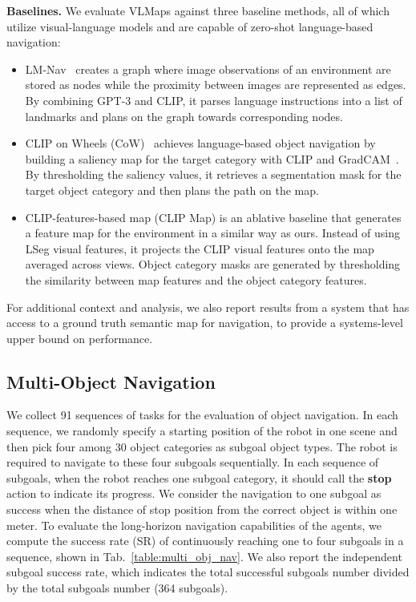 \documentclass[letterpaper, 10 pt, conference]{ieeeconf}  %
\begin{document}
\noindent\textbf{Baselines.} We evaluate VLMaps against three baseline methods, all of which utilize visual-language models and are capable of zero-shot language-based navigation:
\begin{itemize}[leftmargin=*]
  \item LM-Nav~\cite{shah2022lm} creates a graph where image observations of an environment are stored as nodes while the proximity between images are represented as edges. By combining GPT-3 and CLIP, it parses language instructions into a list of landmarks and plans on the graph towards corresponding nodes. 
  \item CLIP on Wheels (CoW)~\cite{gadre2022clip} achieves language-based object navigation by building a saliency map for the target category with CLIP and GradCAM~\cite{selvaraju2020grad}. By thresholding the saliency values, it retrieves a segmentation mask for the target object category and then plans the path on the map.
  \item CLIP-features-based map (CLIP Map) is an ablative baseline that generates a feature map for the environment in a similar way as ours. Instead of using LSeg visual features, it projects the CLIP visual features onto the map averaged across views. Object category masks are generated by thresholding the similarity between map features and the object category features.
\end{itemize}
For additional context and analysis, we also report results from a system that has access to a ground truth semantic map for navigation, to provide a systems-level upper bound on performance.

\subsection{Multi-Object Navigation}
\label{sec:exp_multi_object_navigation}
We collect 91 sequences of tasks for the evaluation of object navigation. In each sequence, we randomly specify a starting position of the robot in one scene and then pick four among 30 object categories as subgoal object types. The robot is required to navigate to these four subgoals sequentially. In each sequence of subgoals, when the robot reaches one subgoal category, it should call the \textbf{stop} action to indicate its progress. We consider the navigation to one subgoal as success when the distance of stop position from the correct object is within one meter. To evaluate the long-horizon navigation capabilities of the agents, we compute the success rate (SR) of continuously reaching one to four subgoals in a sequence, shown in Tab.~\ref{table:multi_obj_nav}. We also report the independent subgoal success rate, which indicates the total successful subgoals number divided by the total subgoals number (364 subgoals). %
\end{document}
